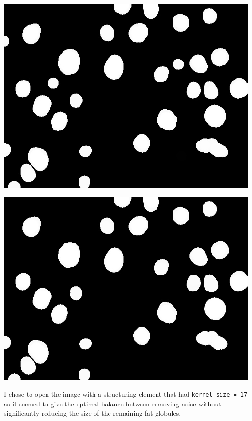 \documentclass[a4paper]{article}
\begin{document}
\begin{minipage}{0.24\textwidth}
    \centering
    \includegraphics[width=\textwidth]{../code/task1/output/kernel_size_29.jpg}
\end{minipage}
\hfill
\begin{minipage}{0.24\textwidth}
    \centering
    \includegraphics[width=\textwidth]{../code/task1/output/kernel_size_31.jpg}
\end{minipage}

I chose to open the image with a structuring element that had \texttt{kernel_size = 17} as it seemed to give the optimal balance between removing noise without significantly reducing the size of the remaining fat globules.
\end{document}
